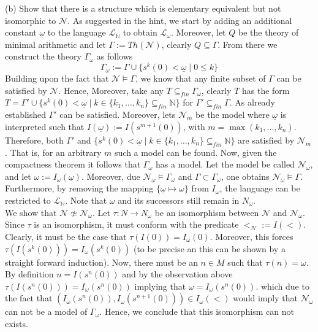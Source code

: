 \documentclass[11pt,a4paper]{article}
\begin{document}
(b) Show that there is a structure which is elementary equivalent but not isomorphic to $\mathcal{N}$. As suggested in the hint, we start by adding an additional constant $\underline{\omega}$ to the language $\mathcal{L}_{\mathbb{N}}$ to obtain $\mathcal{L}_{\omega}$.  Moreover, let $Q$ be the theory of minimal arithmetic and let $\Gamma := Th(\mathcal{N})$, clearly $Q \subseteq \Gamma$. From there we construct the theory $\Gamma_{\omega}$ as follows 
\begin{equation*}
\Gamma_{\omega}:= \Gamma \cup \{ s^k(0)< \underline{\omega} \mid 0\leq k\}
\end{equation*}
Building upon the fact that $\mathcal{N} \models \Gamma$, we know that any finite subset of $\Gamma$ can be satisfied by $\mathcal{N}$. Hence,  Moreover, take any $T \subseteq_{fin} \Gamma_{\omega}$, clearly $T$ has the form $T = \Gamma' \cup  \{ s^k(0)< \underline{\omega} \mid k \in \{k_1,\dots, k_n\} \subseteq_{fin} \mathbb{N}\}$ for $\Gamma'\subseteq_{fin} \Gamma$. As already established $\Gamma'$ can be satisfied. Moreover, lets $\mathcal{N}_m$ be the model where $\underline{\omega}$ is interpreted such that $I(\underline{\omega}):= I(s^{m+1}(0))$, with $m = \max(k_1,\dots, k_n)$. Therefore, both $\Gamma'$ and $\{ s^k(0)< \underline{\omega} \mid k \in \{k_1,\dots, k_n\} \subseteq_{fin} \mathbb{N}\}$ are satisfied by $\mathcal{N}_m$. That is, for an arbitrary $m$ such a model can be found. Now, given the compactness theorem it follows that $\Gamma_{\omega}$ has a model. Let the model be called $\mathcal{N}_{\omega}$, and let $\omega:= I_{\omega}(\underline{\omega})$. Moreover, due $\mathcal{N}_{\omega} \models \Gamma_{\omega}$ and $\Gamma \subset \Gamma_{\omega}$, one obtains $\mathcal{N}_{\omega} \models \Gamma$. Furthermore, by removing the mapping $\{\underline{\omega} \mapsto\omega\}$ from $I_{\omega}$, the language can be restricted to $\mathcal{L}_{\mathbb{N}}$. Note that $\omega$ and its successors still remain in $N_{\omega}$. \\

We show that $\mathcal{N} \nsimeq \mathcal{N}_{\omega}$.  Let $\tau: N \to N_{\omega}$ be an isomorphism between $\mathcal{N}$ and $\mathcal{N}_{\omega}$. Since $\tau$ is  an isomorphism, it must conform with the predicate $<_{\mathcal{N}} := I(<)$. Clearly, it must be the case that $\tau(I(0))= I_{\omega}(0)$. Moreover, this forces $\tau(I(s^k(0)))= I_{\omega}(s^k(0))$ (to be precise an this can be shown by a straight forward induction). Now, there must be an $n \in M$ such that $\tau(n) = \omega$. By definition $n = I(s^n(0))$ and by the observation above $\tau(I(s^n(0))) = I_{\omega}(s^n(0))$ implying that $  \omega = I_{\omega}(s^n(0)) $. which due to the fact that $ (I_{\omega}(s^n(0)),I_{\omega}(s^{n+1}(0))) \in I_{\omega}(<)$ would imply that $\mathcal{N}_{\omega}$ can not be a model of $\Gamma_{\omega}$. Hence, we conclude that this isomorphism can not exists.\\
\end{document}
